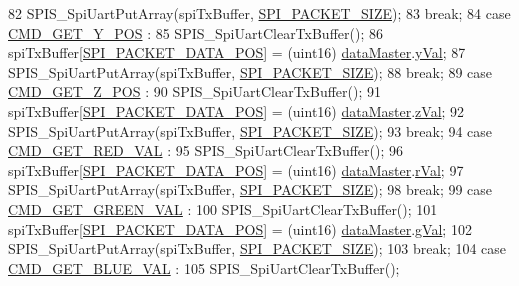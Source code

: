 \begin{DoxyCode}
{{82           SPIS\_SpiUartPutArray(spiTxBuffer, \hyperlink{spi_8h_aea54fc09a960e5a1b7096374f3eebee4}{SPI\_PACKET\_SIZE});
83           \textcolor{keywordflow}{break};
84         \textcolor{keywordflow}{case} \hyperlink{handler_8h_a51053e5251048d6ebbf4d2e23de40761}{CMD\_GET\_Y\_POS} :
85           SPIS\_SpiUartClearTxBuffer();
86           spiTxBuffer[\hyperlink{spi_8h_a5ffe58623f478b7b960a1349530a6655}{SPI\_PACKET\_DATA\_POS}] = (uint16)
      \hyperlink{data_8h_a6b1a8871e30b304a6f5764c44d89e489}{dataMaster}.\hyperlink{data_8h_a28e89368b5a1aee30ccd952ad63e8c55}{yVal};
87           SPIS\_SpiUartPutArray(spiTxBuffer, \hyperlink{spi_8h_aea54fc09a960e5a1b7096374f3eebee4}{SPI\_PACKET\_SIZE});
88           \textcolor{keywordflow}{break};
89         \textcolor{keywordflow}{case} \hyperlink{handler_8h_a4d76e78d09a00f75609569d9aa92ab98}{CMD\_GET\_Z\_POS} :
90           SPIS\_SpiUartClearTxBuffer();
91           spiTxBuffer[\hyperlink{spi_8h_a5ffe58623f478b7b960a1349530a6655}{SPI\_PACKET\_DATA\_POS}] = (uint16)
      \hyperlink{data_8h_a6b1a8871e30b304a6f5764c44d89e489}{dataMaster}.\hyperlink{data_8h_a767a084c35fdc0f1e3e41972d5415483}{zVal};
92           SPIS\_SpiUartPutArray(spiTxBuffer, \hyperlink{spi_8h_aea54fc09a960e5a1b7096374f3eebee4}{SPI\_PACKET\_SIZE});
93           \textcolor{keywordflow}{break};
94         \textcolor{keywordflow}{case} \hyperlink{handler_8h_aa2f09e60c4eeae4560da88c6b1b08c60}{CMD\_GET\_RED\_VAL} :
95           SPIS\_SpiUartClearTxBuffer();
96           spiTxBuffer[\hyperlink{spi_8h_a5ffe58623f478b7b960a1349530a6655}{SPI\_PACKET\_DATA\_POS}] = (uint16)
      \hyperlink{data_8h_a6b1a8871e30b304a6f5764c44d89e489}{dataMaster}.\hyperlink{data_8h_a3bf14030a39e71a91c0b97a624f95c5d}{rVal};
97           SPIS\_SpiUartPutArray(spiTxBuffer, \hyperlink{spi_8h_aea54fc09a960e5a1b7096374f3eebee4}{SPI\_PACKET\_SIZE});
98           \textcolor{keywordflow}{break};
99         \textcolor{keywordflow}{case} \hyperlink{handler_8h_a55d24f50aeb52afddd491d97a66c81ef}{CMD\_GET\_GREEN\_VAL} :
100           SPIS\_SpiUartClearTxBuffer();
101           spiTxBuffer[\hyperlink{spi_8h_a5ffe58623f478b7b960a1349530a6655}{SPI\_PACKET\_DATA\_POS}] = (uint16)
      \hyperlink{data_8h_a6b1a8871e30b304a6f5764c44d89e489}{dataMaster}.\hyperlink{data_8h_ae02d0c792549f1b88e80ae6eb117f2be}{gVal};
102           SPIS\_SpiUartPutArray(spiTxBuffer, \hyperlink{spi_8h_aea54fc09a960e5a1b7096374f3eebee4}{SPI\_PACKET\_SIZE});
103           \textcolor{keywordflow}{break};
104         \textcolor{keywordflow}{case} \hyperlink{handler_8h_a81052c67f996705d7eacfcea66bdde08}{CMD\_GET\_BLUE\_VAL} :
105           SPIS\_SpiUartClearTxBuffer();
}}
\end{DoxyCode}
